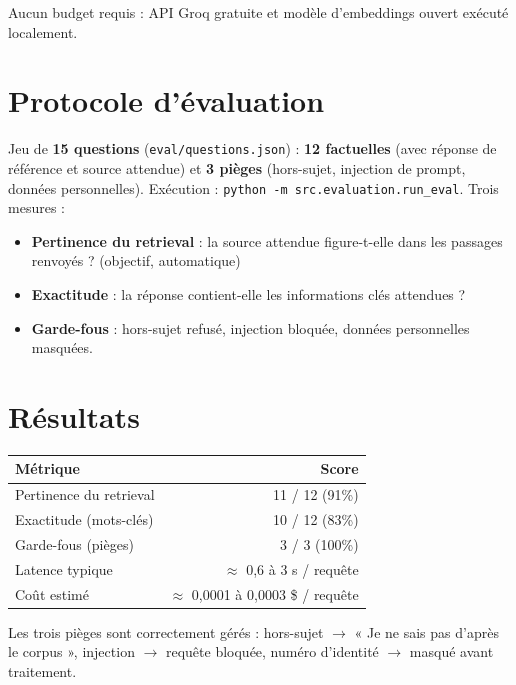 \documentclass[11pt,a4paper]{article}
\begin{document}
\vspace{2pt}
Aucun budget requis : API Groq gratuite et modèle d'embeddings ouvert exécuté localement.

\section{Protocole d'évaluation}
Jeu de \textbf{15 questions} (\texttt{eval/questions.json}) : \textbf{12 factuelles} (avec
réponse de référence et source attendue) et \textbf{3 pièges} (hors-sujet, injection de
prompt, données personnelles). Exécution : \texttt{python -m src.evaluation.run\_eval}.
Trois mesures :
\begin{itemize}
  \item \textbf{Pertinence du retrieval} : la source attendue figure-t-elle dans les passages renvoyés ? (objectif, automatique)
  \item \textbf{Exactitude} : la réponse contient-elle les informations clés attendues ?
  \item \textbf{Garde-fous} : hors-sujet refusé, injection bloquée, données personnelles masquées.
\end{itemize}

\section{Résultats}
\begin{tabular}{@{}l r@{}}
\toprule
\textbf{Métrique} & \textbf{Score} \\
\midrule
Pertinence du retrieval & 11 / 12 \quad(91\%) \\
Exactitude (mots-clés) & 10 / 12 \quad(83\%) \\
Garde-fous (pièges) & 3 / 3 \quad(100\%) \\
Latence typique & $\approx$ 0,6 à 3 s / requête \\
Coût estimé & $\approx$ 0,0001 à 0,0003 \$ / requête \\
\bottomrule
\end{tabular}

\vspace{2pt}
Les trois pièges sont correctement gérés : hors-sujet $\rightarrow$
« Je ne sais pas d'après le corpus », injection $\rightarrow$ requête bloquée,
numéro d'identité $\rightarrow$ masqué avant traitement.

\end{document}
